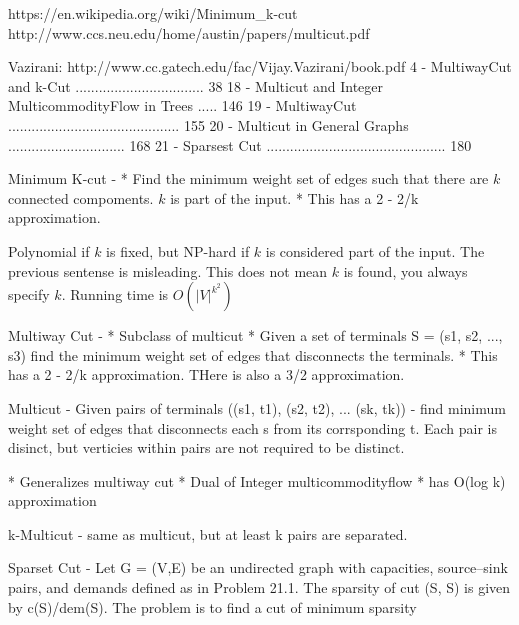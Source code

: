 
https://en.wikipedia.org/wiki/Minimum_k-cut
http://www.ccs.neu.edu/home/austin/papers/multicut.pdf


Vazirani:  
    http://www.cc.gatech.edu/fac/Vijay.Vazirani/book.pdf
    4 - MultiwayCut and k-Cut ................................. 38
    18 - Multicut and Integer MulticommodityFlow in Trees ..... 146
    19 - MultiwayCut ............................................ 155
    20 - Multicut in General Graphs .............................. 168
    21 - Sparsest Cut .............................................. 180


Minimum K-cut -
    * Find the minimum weight set of edges such that there are $k$ connected compoments. $k$ is part of the input.
    * This has a 2 - 2/k approximation.
    
    Polynomial if $k$ is fixed, but NP-hard if $k$ is considered part of the
      input.
    The previous sentense is misleading.
    This does not mean $k$ is found, you always specify $k$.
    Running time is $O(|V|^{k^2})$

Multiway Cut - 
    * Subclass of multicut
    * Given a set of terminals S = (s1, s2, ..., s3) find the minimum weight
      set of edges that disconnects the terminals.
    * This has a 2 - 2/k approximation. THere is also a 3/2 approximation.

Multicut - 
    Given pairs of terminals ((s1, t1), (s2, t2), ... (sk, tk)) - find minimum weight set of edges that
    disconnects each s from its corrsponding t.  Each pair is disinct, but
    verticies within pairs are not required to be distinct.


    * Generalizes multiway cut
    * Dual of Integer multicommodityflow
    * has O(log k) approximation

k-Multicut - 
    same as multicut, but at least k pairs are separated.

Sparset Cut -
    Let G = (V,E) be an undirected graph
    with capacities, source–sink pairs, and demands defined as in Problem 21.1.
    The sparsity of cut (S, S) is given by c(S)/dem(S). 
    The problem is to find a cut of minimum sparsity
